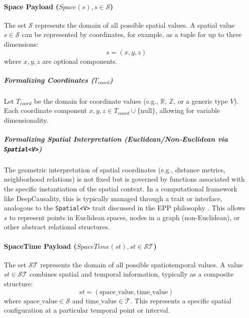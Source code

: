 \paragraph[Space Payload]{Space Payload (\(Space(s), s \in \mathcal{S}\))}\label{par:space_payload}

The set \(\mathcal{S}\) represents the domain of all possible spatial values. A spatial value \(s \in \mathcal{S}\) can be represented by coordinates, for example, as a tuple for up to three dimensions:
\[ s = (x, y, z) \]
where \(x, y, z\) are optional components.

\subparagraph[Coordinates]{Formalizing Coordinates (\(T_{coord}\))}
\label{subpar:coordinates}

Let \(T_{coord}\) be the domain for coordinate values (e.g., \(\mathbb{R}\), \(\mathbb{Z}\), or a generic type \(V\)). Each coordinate component \(x, y, z \in T_{coord} \cup \{\text{null}\}\), allowing for variable dimensionality.

\subparagraph[Spatial Interpretation]{Formalizing Spatial Interpretation (Euclidean/Non-Euclidean via \texttt{Spatial<V>})}
\label{subpar:spatial_interpretation}

The geometric interpretation of spatial coordinates (e.g., distance metrics, neighborhood relations) is not fixed but is governed by functions associated with the specific instantiation of the spatial context. In a computational framework like DeepCausality, this is typically managed through a trait or interface, analogous to the \texttt{Spatial<V>} trait discussed in the EPP philosophy \cite{Hansen2025EPP}. This allows \(s\) to represent points in Euclidean spaces, nodes in a graph (non-Euclidean), or other abstract relational structures.

\paragraph[SpaceTime Payload]{SpaceTime Payload (\(SpaceTime(st), st \in \mathcal{ST}\))}\label{par:spacetime_payload}

The set \(\mathcal{ST}\) represents the domain of all possible spatiotemporal values. A value \(st \in \mathcal{ST}\) combines spatial and temporal information, typically as a composite structure:
\[ st = (\text{space\_value}, \text{time\_value}) \]
where \(\text{space\_value} \in \mathcal{S}\) and \(\text{time\_value} \in \mathcal{T}\). This represents a specific spatial configuration at a particular temporal point or interval.


